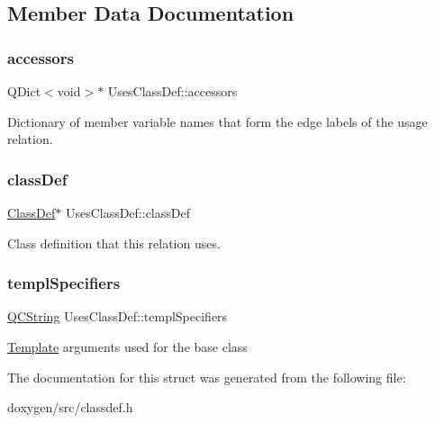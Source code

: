 \subsection{Member Data Documentation}
\mbox{\label{struct_uses_class_def_a41838afce51128c142e9fbb4998aa7c6}} 
\subsubsection{\texorpdfstring{accessors}{accessors}}
{\footnotesize\ttfamily Q\+Dict$<$void$>$$\ast$ Uses\+Class\+Def\+::accessors}

Dictionary of member variable names that form the edge labels of the usage relation. \mbox{\label{struct_uses_class_def_ae9ace813f9031b4afb6894e5ad15f901}} 
\subsubsection{\texorpdfstring{classDef}{classDef}}
{\footnotesize\ttfamily \mbox{\hyperlink{class_class_def}{Class\+Def}}$\ast$ Uses\+Class\+Def\+::class\+Def}

Class definition that this relation uses. \mbox{\label{struct_uses_class_def_a5f65373ed5c0409ef538193d0e58f06d}} 
\subsubsection{\texorpdfstring{templSpecifiers}{templSpecifiers}}
{\footnotesize\ttfamily \mbox{\hyperlink{class_q_c_string}{Q\+C\+String}} Uses\+Class\+Def\+::templ\+Specifiers}

\mbox{\hyperlink{class_template}{Template}} arguments used for the base class 

The documentation for this struct was generated from the following file\+:\begin{DoxyCompactItemize}
\item 
doxygen/src/classdef.\+h\end{DoxyCompactItemize}
